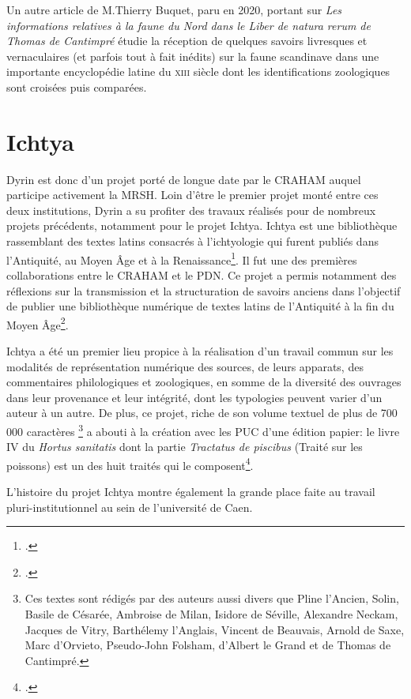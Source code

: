 \documentclass[a4paper,12pt,twoside]{book}
\begin{document}
   Un autre article de M.Thierry Buquet, paru en 2020, portant sur \og \textit{Les informations relatives à la faune du Nord dans le Liber de natura rerum de Thomas de Cantimpré}\fg{} étudie la réception de quelques savoirs livresques et vernaculaires (et parfois tout à fait inédits) sur la faune scandinave dans une importante encyclopédie latine du \textsc{xiii}\ieme{} siècle dont les identifications zoologiques sont croisées puis comparées.
   
    \section{Ichtya}
   Dyrin est donc d'un projet porté de longue date par le \acrshort{CRAHAM} auquel participe activement la \acrfull{MRSH}. Loin d'être le premier projet monté entre ces deux institutions, Dyrin a su profiter des travaux réalisés pour de nombreux projets précédents, notamment pour le projet Ichtya. Ichtya est une bibliothèque rassemblant des textes latins consacrés à l'ichtyologie qui furent publiés dans l'Antiquité, au Moyen Âge et à la Renaissance\footcite{ichtya}. Il fut une des premières collaborations entre le \acrshort{CRAHAM} et le \acrshort{PDN}. Ce projet a permis notamment des
   réflexions sur la transmission et la structuration de savoirs anciens dans l'objectif de publier une bibliothèque numérique de textes latins de l'Antiquité à la fin du Moyen Âge\footcite{buquet_ichtya_nodate}.
   
   Ichtya a été un premier lieu propice à la réalisation d'un travail commun sur les modalités de représentation numérique des sources, de leurs apparats, des commentaires philologiques et zoologiques, en somme de la diversité des ouvrages dans leur provenance et leur intégrité, dont les typologies peuvent varier d'un auteur à un autre. De plus, ce projet, riche de son volume textuel de plus de 700 000 caractères \footnote{Ces textes sont rédigés par des auteurs aussi divers que Pline l'Ancien, Solin, Basile de Césarée, Ambroise de Milan, Isidore de Séville, Alexandre Neckam, Jacques de Vitry, Barthélemy l'Anglais, Vincent de Beauvais, Arnold de Saxe, Marc d'Orvieto, Pseudo-John Folsham, d'Albert le Grand et de Thomas de Cantimpré.} a abouti à la création avec les \acrfull{PUC} d'une édition papier: le livre IV du \textit{Hortus sanitatis} dont la partie \textit{Tractatus de piscibus} (Traité sur les poissons) est un des huit traités qui le composent\footcite{noauthor_piscibus_nodate}. 
   
   L'histoire du projet Ichtya montre également la grande place faite au travail pluri-institutionnel au sein de l'université de Caen.
    
\end{document}
